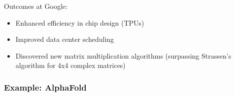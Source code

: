 \begin{frame}
    

    Outcomes at Google:

        \vspace{0.5em}

    \begin{itemize}
        \item Enhanced efficiency in chip design (TPUs)
        \vspace{0.5em}
        \vspace{0.5em}
        \item Improved data center scheduling
        \vspace{0.5em}
        \vspace{0.5em}
        \item Discovered new matrix multiplication algorithms (surpassing Strassen's algorithm for 4x4 complex matrices) 
    \end{itemize}

\end{frame}

\begin{frame}\frametitle{Example: AlphaFold}
    
    \begin{figure}
       \centering
    \end{figure}

\end{frame}

